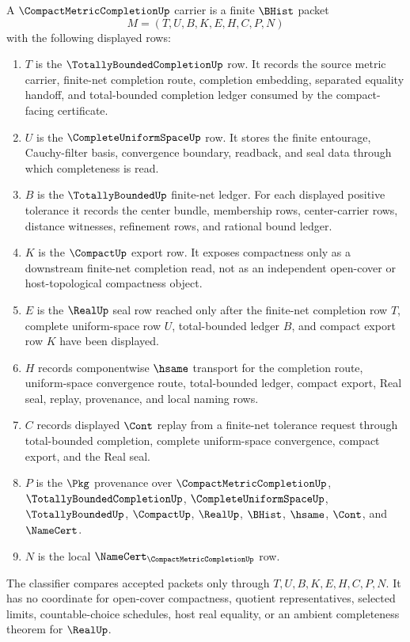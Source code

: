 \begin{definition}\label{def:compact-metric-completion-carrier}
A $\CompactMetricCompletionUp$ carrier is a finite $\BHist$ packet
$$
M=(T,U,B,K,E,H,C,P,N)
$$
with the following displayed rows:
\begin{enumerate}
\item $T$ is the $\TotallyBoundedCompletionUp$ row. It records the source metric carrier, finite-net completion route, completion embedding, separated equality handoff, and total-bounded completion ledger consumed by the compact-facing certificate.
\item $U$ is the $\CompleteUniformSpaceUp$ row. It stores the finite entourage, Cauchy-filter basis, convergence boundary, readback, and seal data through which completeness is read.
\item $B$ is the $\TotallyBoundedUp$ finite-net ledger. For each displayed positive tolerance it records the center bundle, membership rows, center-carrier rows, distance witnesses, refinement rows, and rational bound ledger.
\item $K$ is the $\CompactUp$ export row. It exposes compactness only as a downstream finite-net completion read, not as an independent open-cover or host-topological compactness object.
\item $E$ is the $\RealUp$ seal row reached only after the finite-net completion row $T$, complete uniform-space row $U$, total-bounded ledger $B$, and compact export row $K$ have been displayed.
\item $H$ records componentwise $\hsame$ transport for the completion route, uniform-space convergence route, total-bounded ledger, compact export, Real seal, replay, provenance, and local naming rows.
\item $C$ records displayed $\Cont$ replay from a finite-net tolerance request through total-bounded completion, complete uniform-space convergence, compact export, and the Real seal.
\item $P$ is the $\Pkg$ provenance over $\CompactMetricCompletionUp$, $\TotallyBoundedCompletionUp$, $\CompleteUniformSpaceUp$, $\TotallyBoundedUp$, $\CompactUp$, $\RealUp$, $\BHist$, $\hsame$, $\Cont$, and $\NameCert$.
\item $N$ is the local $\NameCert_{\CompactMetricCompletionUp}$ row.
\end{enumerate}
The classifier compares accepted packets only through $T,U,B,K,E,H,C,P,N$. It has no coordinate for open-cover compactness, quotient representatives, selected limits, countable-choice schedules, host real equality, or an ambient completeness theorem for $\RealUp$.
\end{definition}

